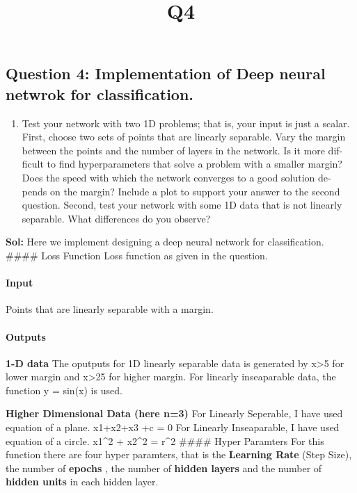 \documentclass[11pt]{article}
\title{Q4}
\providecommand{\tightlist}{%
      \setlength{\itemsep}{0pt}\setlength{\parskip}{0pt}}
\begin{document}
    
    
    \maketitle
    
    

    
    \subsection{Question 4: Implementation of Deep neural netwrok for
classification.}\label{question-4-implementation-of-deep-neural-netwrok-for-classification.}

\begin{enumerate}
\def\labelenumi{(\alph{enumi})}
\tightlist
\item
  Test your network with two 1D problems; that is, your input is just a
  scalar. First, choose two sets of points that are linearly separable.
  Vary the margin between the points and the number of layers in the
  network. Is it more dif- ficult to find hyperparameters that solve a
  problem with a smaller margin? Does the speed with which the network
  converges to a good solution de- pends on the margin? Include a plot
  to support your answer to the second question. Second, test your
  network with some 1D data that is not linearly separable. What
  differences do you observe?
\end{enumerate}

    \textbf{Sol:} Here we implement designing a deep neural network for
classification.\\
\#\#\#\# Loss Function Loss function as given in the question.

\paragraph{Input}\label{input}

Points that are linearly separable with a margin.

\paragraph{Outputs}\label{outputs}

\textbf{1-D data} The oputputs for 1D linearly separable data is
generated by x\textgreater{}5 for lower margin and x\textgreater{}25 for
higher margin. For linearly inseaparable data, the function y = sin(x)
is used.

\textbf{Higher Dimensional Data (here n=3)} For Linearly Seperable, I
have used equation of a plane. x1+x2+x3 +c = 0 For Linearly
Inseaparable, I have used equation of a circle. x1\^{}2 + x2\^{}2 =
r\^{}2 \#\#\#\# Hyper Paramters For this function there are four hyper
paramters, that is the \textbf{Learning Rate} (Step Size), the number of
\textbf{epochs} , the number of \textbf{hidden layers} and the number of
\textbf{hidden units} in each hidden layer.
\end{document}
